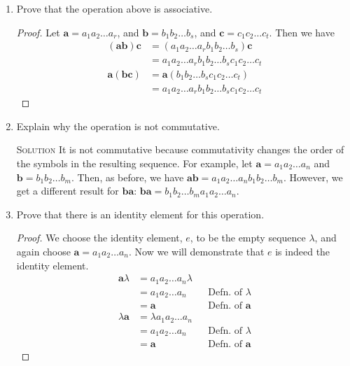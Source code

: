 \documentclass[draft,twoside]{amsart}
\newcommand{\Solution}{\textsc{Solution}\xspace}
\begin{document}
\begin{enumerate}
   \item Prove that the operation above is associative.
   
   \begin{proof}
      Let $\mathbf{a} = a_1 a_2 \ldots a_r$, and $\mathbf{b} = b_1 b_2
      \ldots b_s$, and $\mathbf{c} = c_1 c_2 \ldots c_t$. Then we have
      \begin{align*}
        (\mathbf{ab})\mathbf{c} 
	               & = (a_1 a_2 \ldots a_r b_1 b_2 \ldots b_s)\mathbf{c}\\
	               & = a_1 a_2 \ldots a_r b_1 b_2 \ldots b_s c_1 c_2 
		           \ldots c_t \\
        \mathbf{a}(\mathbf{bc})
	               & = \mathbf{a}(b_1 b_2 \ldots b_s c_1 c_2 \ldots c_t)\\
	               & = a_1 a_2 \ldots a_r b_1 b_2 \ldots b_s c_1 c_2 
		           \ldots c_t 
      \end{align*}
   \end{proof}

   \item Explain why the operation is not commutative. 
   
   \noindent \Solution It is not commutative
   because commutativity changes the order of the symbols in the resulting
   sequence. For example, let $\mathbf{a} = a_1 a_2 \ldots a_n$ and 
   $\mathbf{b} = b_1 b_2 \ldots b_m$. Then, as before, we have 
   $\mathbf{ab} = a_1 a_2 \ldots a_n b_1 b_2 \ldots b_m$. However, we
   get a different result for $\mathbf{ba}$: $\mathbf{ba} = b_1 b_2 \ldots
   b_m a_1 a_2 \ldots a_n$.

   \item Prove that there is an identity element for this operation.

   \begin{proof}
      We choose the identity element, $e$, to be the empty sequence $\lambda$,
      and again choose $\mathbf{a} = a_1 a_2 \ldots a_n$.
      Now we will demonstrate that $e$ is indeed the identity element.
      \begin{align*}
         \mathbf{a}\lambda & = a_1 a_2 \ldots a_n \lambda \\
	                   & = a_1 a_2 \ldots a_n 
			            && \text{Defn. of $\lambda$} \\
			   & = \mathbf{a} && \text{Defn. of $\mathbf{a}$} \\
	 \lambda\mathbf{a} & = \lambda a_1 a_2 \ldots a_n \\
	                   & = a_1 a_2 \ldots a_n 
			            && \text{Defn. of $\lambda$} \\
			   & = \mathbf{a} && \text{Defn. of $\mathbf{a}$} 
      \end{align*}
   \end{proof}

\end{enumerate}
\end{document}
